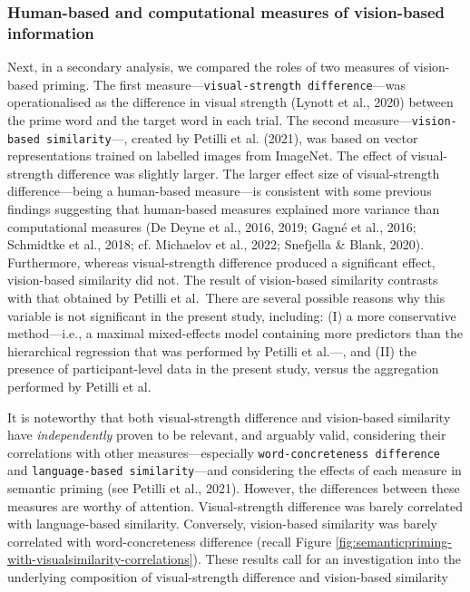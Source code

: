 \documentclass[
  12pt,
  man,floatsintext]{apa7}
\begin{document}
\hypertarget{human-based-and-computational-measures-of-vision-based-information}{%
\subsubsection{Human-based and computational measures of vision-based information}\label{human-based-and-computational-measures-of-vision-based-information}}

Next, in a secondary analysis, we compared the roles of two measures of vision-based priming. The first measure---\texttt{visual-strength\ difference}---was operationalised as the difference in visual strength (Lynott et al., 2020) between the prime word and the target word in each trial. The second measure---\texttt{vision-based\ similarity}---, created by Petilli et al. (2021), was based on vector representations trained on labelled images from ImageNet. The effect of visual-strength difference was slightly larger. The larger effect size of visual-strength difference---being a human-based measure---is consistent with some previous findings suggesting that human-based measures explained more variance than computational measures (De Deyne et al., 2016, 2019; Gagné et al., 2016; Schmidtke et al., 2018; cf. Michaelov et al., 2022; Snefjella \& Blank, 2020). Furthermore, whereas visual-strength difference produced a significant effect, vision-based similarity did not. The result of vision-based similarity contrasts with that obtained by Petilli et al.~There are several possible reasons why this variable is not significant in the present study, including: (I) a more conservative method---i.e., a maximal mixed-effects model containing more predictors than the hierarchical regression that was performed by Petilli et al.---, and (II) the presence of participant-level data in the present study, versus the aggregation performed by Petilli et al.

It is noteworthy that both visual-strength difference and vision-based similarity have \emph{independently} proven to be relevant, and arguably valid, considering their correlations with other measures---especially \texttt{word-concreteness\ difference} and \texttt{language-based\ similarity}---and considering the effects of each measure in semantic priming (see Petilli et al., 2021). However, the differences between these measures are worthy of attention. Visual-strength difference was barely correlated with language-based similarity. Conversely, vision-based similarity was barely correlated with word-concreteness difference (recall Figure \ref{fig:semanticpriming-with-visualsimilarity-correlations}). These results call for an investigation into the underlying composition of visual-strength difference and vision-based similarity
\end{document}
